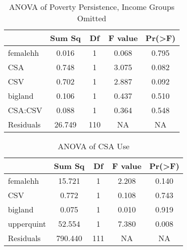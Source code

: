 \documentclass[
]{article}
\begin{document}
\begin{table}

\caption{\label{tab:printtables}ANOVA of Poverty Persistence, Income Groups Omitted}
\centering
\begin{tabular}[t]{lcccc}
\toprule
  & Sum Sq & Df & F value & Pr(>F)\\
\midrule
femalehh & 0.016 & 1 & 0.068 & 0.795\\
 
CSA & 0.748 & 1 & 3.075 & 0.082\\
 
CSV & 0.702 & 1 & 2.887 & 0.092\\
 
bigland & 0.106 & 1 & 0.437 & 0.510\\
 
CSA:CSV & 0.088 & 1 & 0.364 & 0.548\\
 
Residuals & 26.749 & 110 & NA & NA\\
\bottomrule
\end{tabular}
\end{table}

\begin{table}

\caption{\label{tab:printtables}ANOVA of CSA Use}
\centering
\begin{tabular}[t]{lcccc}
\toprule
  & Sum Sq & Df & F value & Pr(>F)\\
\midrule
femalehh & 15.721 & 1 & 2.208 & 0.140\\
 
CSV & 0.772 & 1 & 0.108 & 0.743\\
 
bigland & 0.075 & 1 & 0.010 & 0.919\\
 
upperquint & 52.554 & 1 & 7.380 & 0.008\\
 
Residuals & 790.440 & 111 & NA & NA\\
\bottomrule
\end{tabular}
\end{table}
\end{document}
